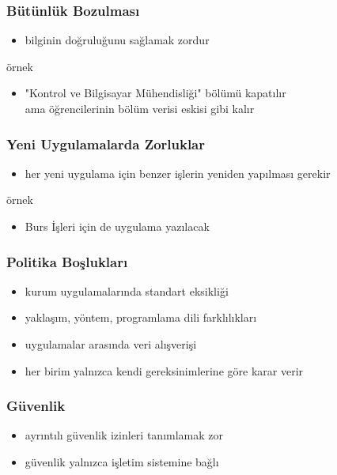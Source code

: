 \documentclass[dvipsnames]{beamer}
\theoremstyle{plain}
\begin{document}
\begin{frame}
  \frametitle{Bütünlük Bozulması}

  \begin{itemize}
    \item bilginin doğruluğunu sağlamak zordur
  \end{itemize}

  \medskip
  \begin{exampleblock}{örnek}
    \begin{itemize}
      \item "Kontrol ve Bilgisayar Mühendisliği" bölümü kapatılır\\
        ama öğrencilerinin bölüm verisi eskisi gibi kalır
    \end{itemize}
  \end{exampleblock}
\end{frame}

\begin{frame}
  \frametitle{Yeni Uygulamalarda Zorluklar}

  \begin{itemize}
    \item her yeni uygulama için benzer işlerin yeniden yapılması gerekir
  \end{itemize}

  \medskip
  \begin{exampleblock}{örnek}
    \begin{itemize}
      \item Burs İşleri için de uygulama yazılacak
    \end{itemize}
  \end{exampleblock}
\end{frame}

\begin{frame}
  \frametitle{Politika Boşlukları}

  \begin{itemize}
    \item kurum uygulamalarında standart eksikliği
    \item yaklaşım, yöntem, programlama dili farklılıkları
    \item uygulamalar arasında veri alışverişi

    \pause
    \medskip
    \item her birim yalnızca kendi gereksinimlerine göre karar verir
  \end{itemize}
\end{frame}

\begin{frame}
  \frametitle{Güvenlik}

  \begin{itemize}
    \item ayrıntılı güvenlik izinleri tanımlamak zor
    \item güvenlik yalnızca işletim sistemine bağlı
  \end{itemize}
\end{frame}
\end{document}
